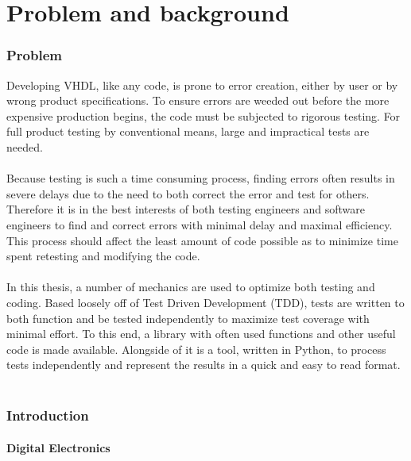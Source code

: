 \documentclass[11pt,british]{article}
\begin{document}

\part{Problem and background}


\section{Problem}

Developing VHDL, like any code, is prone to error creation, either by user or by wrong product specifications. To ensure errors are weeded out before the more expensive production begins, the code must be subjected to rigorous testing. For full product testing by conventional means, large and impractical tests are needed.
\\
\\
Because testing is such a time consuming process, finding errors often
results in severe delays due to the need to both correct the error
and test for others. Therefore it is in the best interests of both
testing engineers and software engineers to find and correct errors
with minimal delay and maximal efficiency. This process should affect
the least amount of code possible as to minimize time spent retesting
and modifying the code.
\\
\\
In this thesis, a number of mechanics are used to optimize both testing
and coding. Based loosely off of Test Driven Development (TDD), tests
are written to both function and be tested independently to maximize
test coverage with minimal effort. To this end, a library with often
used functions and other useful code is made available. Alongside
of it is a tool, written in Python, to process tests independently 
and represent the results in a quick and easy to read format.
\\
\\


\newpage{}


\section{Introduction}


\subsection{Digital Electronics}
\end{document}
